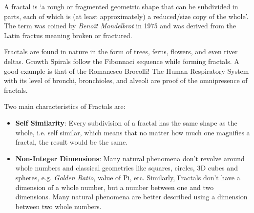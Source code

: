 \documentclass{resonance}
\begin{document}
	
A fractal is ‘a rough or fragmented geometric shape that can be subdivided in parts, each of which is (at least approximately) a reduced/size copy of the whole’. The term was coined by \textit{Benoît Mandelbrot} in 1975 and was derived from the Latin fractus meaning broken or fractured.

Fractals are found in nature in the form of trees, ferns, flowers, and even river deltas. Growth Spirals follow the Fibonnaci sequence while forming fractals. A good example is that of the Romanesco Brocolli! The Human Respiratory System with its level of bronchi, bronchioles, and alveoli are proof of the omnipresence of fractals.

Two main characteristics of Fractals are:
\begin{itemize}
    \item \textbf{Self Similarity}: Every subdivision of a fractal has the same shape as the whole, i.e. self similar, which means that no matter how much one magnifies a fractal, the result would be the same.
    

    \item \textbf{Non-Integer Dimensions}: Many natural phenomena don’t revolve around whole numbers and classical geometries like squares, circles, 3D cubes and spheres, e.g. \textit{Golden Ratio}, value of Pi, etc. Similarly, Fractals don’t have a dimension of a whole number, but a number between one and two dimensions. Many natural phenomena are better described using a dimension between two whole numbers.
\end{itemize}
\end{document}
